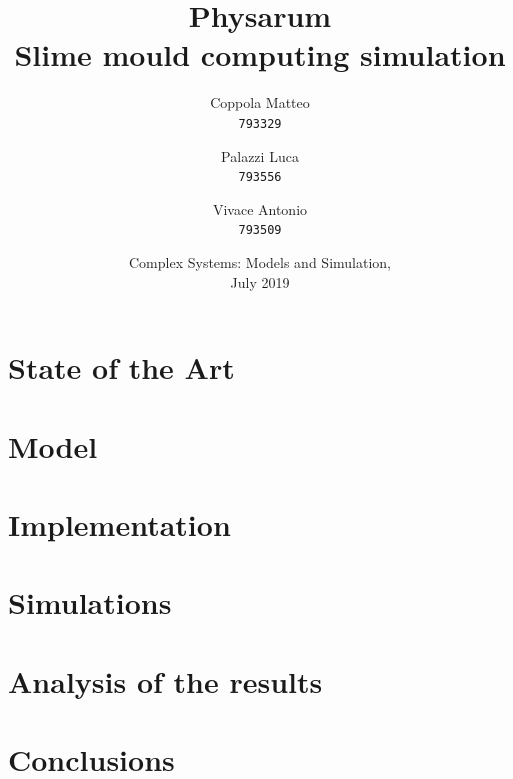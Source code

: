 \documentclass{report}
\begin{document}

\title{%
  \Huge Physarum\\
  \large Slime mould computing simulation\\
    }
\author{
  Coppola Matteo\\
  \texttt{793329}
  \and
  Palazzi Luca\\
  \texttt{793556}
   \and
  Vivace Antonio\\
  \texttt{793509}
}
\date{Complex Systems: Models and Simulation, \\ July 2019}
\maketitle


\tableofcontents
\listoffigures



\chapter{State of the Art}


\chapter{Model}


\chapter{Implementation}


\chapter{Simulations}


\chapter{Analysis of the results}

\chapter{Conclusions}



\end{document}
